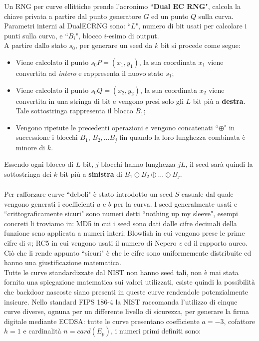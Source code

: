 \documentclass[a4paper,12pt]{tesiinfo}
\begin{document}
Un RNG per curve ellittiche prende l'acronimo ``\textbf{Dual EC RNG}", calcola la chiave privata a partire dal punto generatore $G$ ed un punto $Q$ sulla curva. Parametri interni al DualECRNG sono: ``$L$", numero di bit usati per calcolare i punti sulla curva, e ``$B_i$", blocco $i$-esimo di output.
\\
A partire dallo stato $s_0$, per generare un seed da $k$ bit si procede come segue: 
\begin{itemize}
 \item Viene calcolato il punto $s_0P = (x_1, y_1)$, la sua coordinata $x_1$ viene convertita ad \textit{intero} e rappresenta il nuovo stato $s_1$;
 \item Viene calcolato il punto $s_0Q = (x_2, y_2)$, la sua coordinata $x_2$ viene convertita in una stringa di bit e vengono presi solo gli $L$ bit pi\`u a \textbf{destra}. Tale sottostringa rappresenta il blocco $B_1$;
 \item Vengono ripetute le precedenti operazioni e vengono concatenati ``$\oplus$" in successione i blocchi $B_1$, $B_2, \ldots B_j$ fin quando la loro lunghezza combinata \`e minore di $k$. 
\end{itemize}
Essendo ogni blocco di $L$ bit, $j$ blocchi hanno lunghezza $jL$, il seed sar\`a quindi la sottostringa dei $k$ bit pi\`u a \textbf{sinistra} di $B_1 \oplus B_2 \oplus \ldots \oplus B_j$.
\\
\\
Per rafforzare curve ``deboli" \`e stato introdotto un seed $S$ casuale dal quale vengono generati i coefficienti $a$ e $b$ per la curva. I seed generalmente usati e ``crittograficamente sicuri" sono numeri detti ``nothing up my sleeve", esempi concreti li troviamo in: MD5 in cui i seed sono dati dalle cifre decimali della funzione seno applicata a numeri interi; Blowfish in cui vengono prese le prime cifre di $\pi$; RC5 in cui vengono usati il numero di Nepero \textit{e} ed il rapporto aureo. Ci\`o che li rende appunto ``sicuri" \`e che le cifre sono uniformemente distribuite ed hanno una giustificazione matematica. 
\\
Tutte le curve standardizzate dal NIST non hanno seed tali, non \`e mai stata fornita una spiegazione matematica sui valori utilizzati, esiste quindi la possibilit\`a che backdoor nascoste siano presenti in queste curve rendendole potenzialmente insicure. Nello standard FIPS 186-4 la NIST raccomanda l'utilizzo di cinque curve diverse, ognuna per un differente livello di sicurezza, per generare la firma digitale mediante ECDSA: tutte le curve presentano coefficiente $a=-3$, cofattore $h=1$ e cardinalit\`a $n=card(E_p)$, i numeri primi definiti sono:
\end{document}
